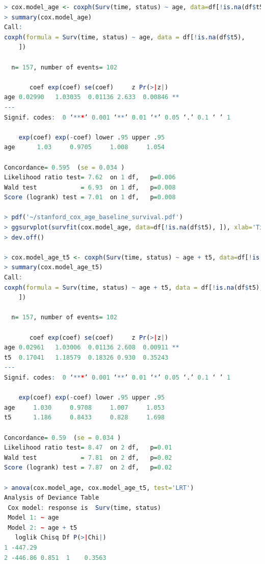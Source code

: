 \begin{lstlisting}[language=R]
> cox.model_age <- coxph(Surv(time, status) ~ age, data=df[!is.na(df$t5), ])
> summary(cox.model_age)
Call:
coxph(formula = Surv(time, status) ~ age, data = df[!is.na(df$t5),
    ])

  n= 157, number of events= 102

       coef exp(coef) se(coef)     z Pr(>|z|)
age 0.02990   1.03035  0.01136 2.633  0.00846 **
---
Signif. codes:  0 ‘***’ 0.001 ‘**’ 0.01 ‘*’ 0.05 ‘.’ 0.1 ‘ ’ 1

    exp(coef) exp(-coef) lower .95 upper .95
age      1.03     0.9705     1.008     1.054

Concordance= 0.595  (se = 0.034 )
Likelihood ratio test= 7.62  on 1 df,   p=0.006
Wald test            = 6.93  on 1 df,   p=0.008
Score (logrank) test = 7.01  on 1 df,   p=0.008

> pdf('~/stanford_cox_age_baseline_survival.pdf')
> ggsurvplot(survfit(cox.model_age, data=df[!is.na(df$t5), ]), xlab='Time', ylab='S(t)', size = 1, linetype = 'strata', palette=c('#4e79a7'), conf.int = TRUE, legend = c(0.85, 0.85), legend.y = 1, legend.title = '', legend.labs = c('Baseline Survival'))
> dev.off()

> cox.model_age_t5 <- coxph(Surv(time, status) ~ age + t5, data=df[!is.na(df$t5), ])
> summary(cox.model_age_t5)
Call:
coxph(formula = Surv(time, status) ~ age + t5, data = df[!is.na(df$t5),
    ])

  n= 157, number of events= 102

       coef exp(coef) se(coef)     z Pr(>|z|)
age 0.02961   1.03006  0.01136 2.608  0.00911 **
t5  0.17041   1.18579  0.18326 0.930  0.35243
---
Signif. codes:  0 ‘***’ 0.001 ‘**’ 0.01 ‘*’ 0.05 ‘.’ 0.1 ‘ ’ 1

    exp(coef) exp(-coef) lower .95 upper .95
age     1.030     0.9708     1.007     1.053
t5      1.186     0.8433     0.828     1.698

Concordance= 0.59  (se = 0.034 )
Likelihood ratio test= 8.47  on 2 df,   p=0.01
Wald test            = 7.81  on 2 df,   p=0.02
Score (logrank) test = 7.87  on 2 df,   p=0.02

> anova(cox.model_age, cox.model_age_t5, test='LRT')
Analysis of Deviance Table
 Cox model: response is  Surv(time, status)
 Model 1: ~ age
 Model 2: ~ age + t5
   loglik Chisq Df P(>|Chi|)
1 -447.29
2 -446.86 0.851  1    0.3563
\end{lstlisting}

